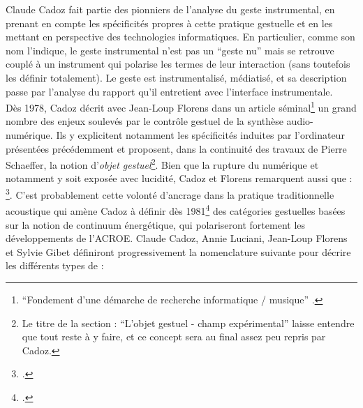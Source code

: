 \noindent Claude Cadoz fait partie des pionniers de l'analyse du geste instrumental, en prenant en compte les spécificités propres à cette pratique gestuelle et en les mettant en perspective des technologies informatiques. En particulier, comme son nom l'indique, le geste instrumental n'est pas un ``geste nu'' mais se retrouve couplé à un instrument qui polarise les termes de leur interaction (sans toutefois les définir totalement). Le geste est instrumentalisé, médiatisé, et sa description passe par l'analyse du rapport qu'il entretient avec l'interface instrumentale.\\
\indent Dès 1978, Cadoz décrit avec Jean-Loup Florens dans un article séminal\footnote{``Fondement d’une démarche de recherche informatique / musique'' \cite{cadoz_fondement_1978}.} un grand nombre des  enjeux soulevés par le contrôle gestuel de la synthèse audio-numérique. Ils y explicitent notamment les spécificités induites par l'ordinateur présentées précédemment et proposent, dans la continuité des travaux de Pierre Schaeffer, la notion d'\textit{objet gestuel}\footnote{Le titre de la section : ``L'objet gestuel - champ expérimental'' laisse entendre que tout reste à y faire, et ce concept sera au final assez peu repris par Cadoz.}. Bien que la rupture du numérique et notamment  y soit exposée avec lucidité, Cadoz et Florens remarquent aussi que : \footnote{\cite{cadoz_fondement_1978}.}. C'est probablement cette volonté d'ancrage dans la pratique traditionnelle acoustique qui amène Cadoz à définir dès 1981\footnote{\cite{cadoz_synthese_1981}.} des catégories gestuelles basées sur la notion de continuum énergétique, qui polariseront fortement les développements de l'\gls{ACROE}. Claude Cadoz, Annie Luciani, Jean-Loup Florens et Sylvie Gibet définiront progressivement la nomenclature suivante pour décrire les différents types de  :
\vspace{-1em}
